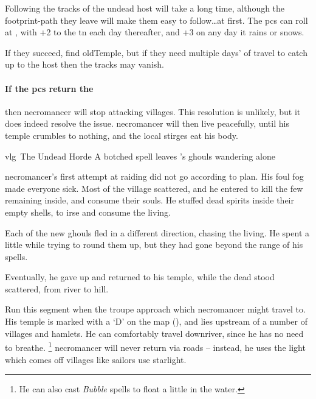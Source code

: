 Following the tracks of the undead host will take a long time, although the footprint-path they leave will make them easy to follow\ldots at first.
The \glspl{pc} can roll  at \tn[5], with +2 to the \gls{tn} each day thereafter, and +3 on any day it rains or snows.

If they succeed, find \gls{oldTemple}, but if they need multiple days' of travel to catch up to the host then the tracks may vanish.

\paragraph{If the \glspl{pc} return the }
then \gls{necromancer} will stop attacking \glspl{village}.
This resolution is unlikely, but it does indeed resolve the issue.
\Gls{necromancer} will then live peacefully, until his temple crumbles to nothing, and the local stirges eat his body.

{\gls{vlg}~The Undead Horde}%
{A botched spell leaves 's ghouls wandering alone}%
\label{necroHorde}

\begin{exampletext}
  \Gls{necromancer}'s first attempt at raiding  did not go according to plan.
  His foul fog made everyone sick.
  Most of the \gls{village} scattered, and he entered to kill the few remaining inside, and consume their souls.
  He stuffed dead spirits inside their empty shells, to irse and consume the living.

  Each of the new ghouls fled in a different direction, chasing the living.
  He spent a little while trying to round them up, but they had gone beyond the range of his spells.

  Eventually, he gave up and returned to his temple, while the dead stood scattered, from river to hill.
\end{exampletext}

Run this \gls{segment} when the troupe approach  which \gls{necromancer} might travel to.
His temple is marked with a `\gls{D}' on the map (), and lies upstream of a number of \glspl{village} and hamlets.
He can comfortably travel downriver, since he has no need to breathe.%
\footnote{He can also cast \textit{Bubble} spells to float a little in the water.}
\Gls{necromancer} will never return via roads -- instead, he uses the light which comes off \glspl{village} like sailors use starlight.

